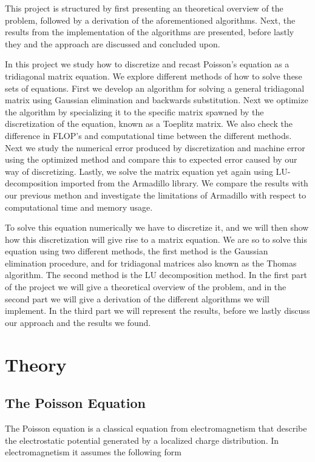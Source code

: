\documentclass[12pt]{article}
\numberwithin{equation}{section}     %
\begin{document}
This project is structured by first presenting an theoretical overview of the problem, followed by a derivation of the aforementioned algorithms. Next, the results from the implementation of the algorithms are presented, before lastly they and the approach are discussed and concluded upon.



In this project we study how to discretize and recast Poisson's equation as a tridiagonal matrix equation. We explore different methods of how to solve these sets of equations. First we develop an algorithm for solving a general tridiagonal matrix using Gaussian elimination and backwards substitution. Next we optimize the algorithm by specializing it to the specific matrix spawned by the discretization of the equation, known as a Toeplitz matrix. We also check the difference in FLOP's and computational time between the different methods. Next we study the numerical error produced by discretization and machine error using the optimized method and compare this to expected error caused by our way of discretizing. Lastly, we
solve the matrix equation yet again using LU-decomposition imported from the Armadillo library. We compare the results with our previous methon and investigate the limitations of Armadillo with respect to computational time and memory usage.

To solve this equation numerically we have to discretize it, and we will then show how this discretization will give rise to a matrix equation. We are so to solve this equation using two different methods, the first method is the Gaussian elimination procedure, and for tridiagonal matrices also known as the Thomas algorithm. The second method is the LU decomposition method. In the first part of the project we will give a theoretical overview of the problem, and in the second part we will give a derivation of the different algorithms we will implement. In the third part we will represent the results, before we lastly discuss our approach and the results we found.

\section{Theory}
\subsection{The Poisson Equation}
The Poisson equation is a classical equation from electromagnetism that describe the electrostatic potential generated by a localized charge distribution. In electromagnetism it assumes the following form
\end{document}
